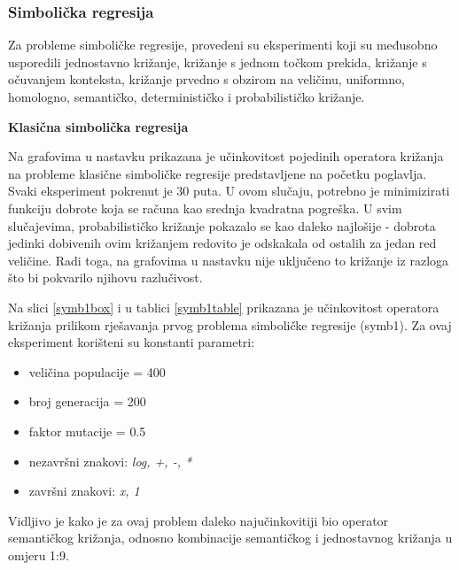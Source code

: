 \subsubsection{Simbolička regresija}

Za probleme simboličke regresije, provedeni su eksperimenti koji su međusobno usporedili jednostavno križanje, križanje s jednom točkom prekida, križanje s očuvanjem konteksta, križanje prvedno s obzirom na veličinu, uniformno, homologno, semantičko, determinističko i probabilističko križanje.

\textbf{Klasična simbolička regresija}


Na grafovima u nastavku prikazana je učinkovitost pojedinih operatora križanja na probleme klasične simboličke regresije predstavljene na početku poglavlja. Svaki eksperiment pokrenut je 30 puta. U ovom slučaju, potrebno je minimizirati funkciju dobrote koja se računa kao srednja kvadratna pogreška. U svim slučajevima, probabilističko križanje pokazalo se kao daleko najlošije - dobrota jedinki dobivenih ovim križanjem redovito je odskakala od ostalih za jedan red veličine. Radi toga, na grafovima u nastavku nije uključeno to križanje iz razloga što bi pokvarilo njihovu razlučivost.

Na slici \ref{symb1box} i u tablici \ref{symb1table} prikazana je učinkovitost operatora križanja prilikom rješavanja prvog problema simboličke regresije (symb1). Za ovaj eksperiment korišteni su konstanti parametri:
\begin{itemize}
\item{veličina populacije = 400}
\item{broj generacija = 200}
\item{faktor mutacije = 0.5}
\item{nezavršni znakovi: \textit{log, +, -, *}}
\item{završni znakovi: \textit{x, 1}}
\end{itemize}

Vidljivo je kako je za ovaj problem daleko najučinkovitiji bio operator semantičkog križanja, odnosno kombinacije semantičkog i jednostavnog križanja u omjeru 1:9. 


